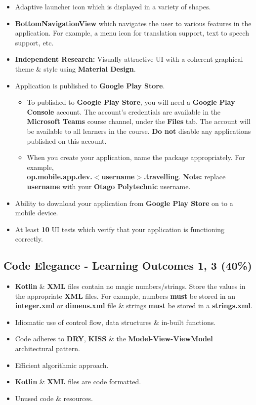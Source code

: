 \documentclass{article}
\begin{document}
\begin{itemize}
	\item Adaptive launcher icon which is displayed in a variety of shapes.
	\item \textbf{BottomNavigationView} which navigates the user to various features in the application. For example, a menu icon for translation support, text to speech support, etc.
	\item \textbf{Independent Research:} Visually attractive UI with a coherent graphical theme \& style using \textbf{Material Design}.
	\item Application is published to \textbf{Google Play Store}.
	      \begin{itemize}
	      	\item To published to \textbf{Google Play Store}, you will need a \textbf{Google Play Console} account. The account's credentials are available in the \textbf{Microsoft Teams} course channel, under the \textbf{Files} tab. The account will be available to all learners in the course. \textbf{Do not} disable any applications published on this account.
	      	\item When you create your application, name the package appropriately. For example, \\ \textbf{op.mobile.app.dev.$<$username$>$.travelling}. \textbf{Note:} replace \textbf{username} with your \textbf{Otago Polytechnic} username.
	      \end{itemize}
	\item Ability to download your application from \textbf{Google Play Store} on to a mobile device.
	\item At least \textbf{10} UI tests which verify that your application is functioning correctly.
\end{itemize}

\subsection*{Code Elegance - Learning Outcomes 1, 3 (40\%)}
\begin{itemize}
	\item \textbf{Kotlin} \& \textbf{XML} files contain no magic numbers/strings. Store the values in the appropriate \textbf{XML} files. For example, numbers \textbf{must} be stored in an \textbf{integer.xml} or \textbf{dimens.xml} file \& strings \textbf{must} be stored in a \textbf{strings.xml}.
	\item Idiomatic use of control flow, data structures \& in-built functions.
	\item Code adheres to \textbf{DRY}, \textbf{KISS} \& the \textbf{Model-View-ViewModel} architectural pattern.
	\item Efficient algorithmic approach.
	\item \textbf{Kotlin} \& \textbf{XML} files are code formatted.
	\item Unused code \& resources.
\end{itemize}
\end{document}
